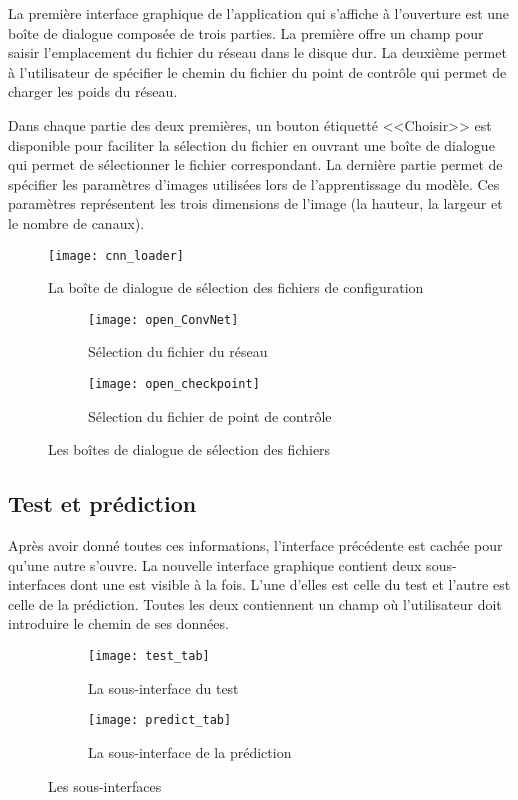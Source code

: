 La première interface graphique de l'application qui s'affiche à l'ouverture est
une boîte de dialogue composée de trois parties. La première offre un champ pour
saisir l'emplacement du fichier du réseau dans le disque dur. La deuxième permet
à l'utilisateur de spécifier le chemin du fichier du point de contrôle qui permet
de charger les poids du réseau.

Dans chaque partie des deux premières, un bouton étiquetté <<Choisir>> est
disponible pour faciliter la sélection du fichier en ouvrant une boîte de
dialogue qui permet de sélectionner le fichier correspondant.
La dernière partie permet de spécifier les paramètres d'images utilisées lors de
l'apprentissage du modèle. Ces paramètres représentent les trois dimensions de l'image
(la hauteur, la largeur et le nombre de canaux).

\begin{figure}[h]
  \centering
  \texttt{[image: cnn\_loader]}
  \caption{La boîte de dialogue de sélection des fichiers de configuration}
\end{figure}

\begin{figure}[h]
\centering
\begin{subfigure}{0.49\textwidth}
  \texttt{[image: open\_ConvNet]}
  \caption{Sélection du fichier du réseau}
\end{subfigure}
\begin{subfigure}{0.49\textwidth}
  \texttt{[image: open\_checkpoint]}
  \caption{Sélection du fichier de point de contrôle}
\end{subfigure}
\caption{Les boîtes de dialogue de sélection des fichiers}
\end{figure}

\subsection{Test et prédiction}

Après avoir donné toutes ces informations, l'interface précédente est cachée
pour qu'une autre s'ouvre. La nouvelle interface graphique contient deux sous-interfaces
dont une est visible à la fois. L'une d'elles est celle du test et l'autre est
celle de la prédiction. Toutes les deux contiennent un champ où l'utilisateur
doit introduire le chemin de ses données.

\begin{figure}[h]
\centering
\begin{subfigure}{0.4\textwidth}
  \texttt{[image: test\_tab]}
  \caption{La sous-interface du test}
\end{subfigure}
\begin{subfigure}{0.4\textwidth}
  \texttt{[image: predict\_tab]}
  \caption{La sous-interface de la prédiction}
\end{subfigure}
\caption{Les sous-interfaces}
\end{figure}

